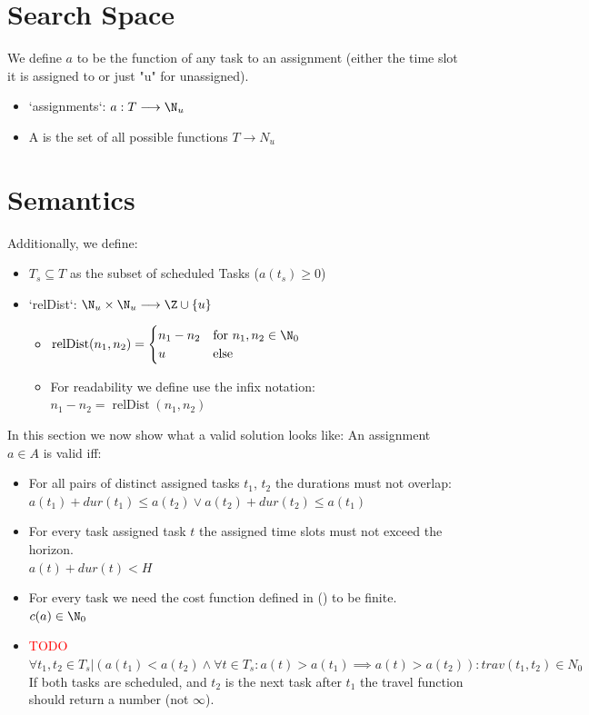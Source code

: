 \section{Search Space}
\label{sec:semantics:search-space}
We define $a$ to be the function of any task to an assignment (either the time slot it is assigned to or just "u" for unassigned).

\begin{itemize}
    \item `assignments`: $a: T \longrightarrow \N_u$
    \item A is the set of all possible functions $T \longrightarrow N_u$
\end{itemize}

\section{Semantics}
\label{sec:semantics:semantics}

Additionally, we define:
\begin{itemize}
    \item $T_s \subseteq T$ as the subset of scheduled Tasks ($a(t_s) \geq 0$)
    \item `relDist`: $\N_u \times \N_u \longrightarrow \Z \cup \{ u \}$
          \begin{itemize}
              \item $\operatorname{relDist}(n_1, n_2) = \begin{cases} n_1 - n_2 & \text{for }n_1, n_2 \in \N_0 \\ u & \text{else}\end{cases}$
              \item For readability we define use the infix notation: $n_1 - n_2 = \operatorname{relDist}(n_1, n_2)$
          \end{itemize}
\end{itemize}

In this section we now show what a valid solution looks like:
An assignment $a \in A$ is valid iff:
\begin{itemize}
    \item For all pairs of distinct assigned tasks $t_1$, $t_2$ the durations must not overlap:\\
          $a(t_1) + \textit{dur}(t_1) \leq a(t_2) \lor a(t_2) + \textit{dur}(t_2) \leq a(t_1)$
    \item For every task assigned task $t$ the assigned time slots must not exceed the horizon.\\
          $a(t) + \textit{dur}(t) < H$
    \item For every task we need the cost function defined in () to be finite.\\
          $c(a) \in \N_0$
    \item \textcolor{red}{TODO} $\forall t_1, t_2 \in T_s | (a(t_1) < a(t_2) \land \forall t \in T_s: a(t) > a(t_1) \implies a(t) > a(t_2)): \textit{trav}(t_1, t_2) \in N_0$\\
          If both tasks are scheduled, and $t_2$ is the next task after $t_1$ the travel function should return a number (not $\infty$).
\end{itemize}

